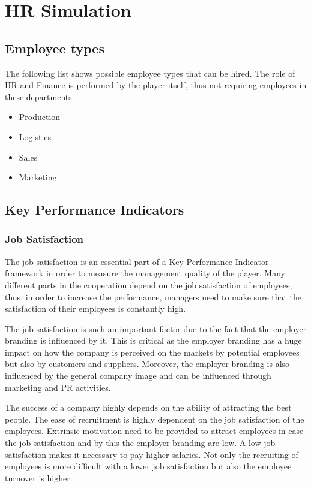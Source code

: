 \section{HR Simulation}

\subsection{Employee types}
The following list shows possible employee types that can be hired. The role of HR and Finance is performed by the player itself, thus not requiring employees in these departments.
\begin{itemize}
    \item Production
    \item Logistics
    \item Sales
    \item Marketing
\end{itemize}



\subsection{Key Performance Indicators}
\subsubsection{Job Satisfaction}
The job satisfaction is an essential part of a Key Performance Indicator framework in order to measure the management quality of the player. Many different parts in the cooperation depend on the job satisfaction of employees, thus, in order to increase the performance, managers need to make sure that the satisfaction of their employees is constantly high.\cite{KOYS}

The job satisfaction is such an important factor due to the fact that the employer branding is influenced by it. This is critical as the employer branding has a huge impact on how the company is perceived on the markets by potential employees but also by customers and suppliers. Moreover, the employer branding is also influenced by the general company image and can be influenced through marketing and PR activities. 

The success of a company highly depends on the ability of attracting the best people. The ease of recruitment is highly dependent on the job satisfaction of the employees. Extrinsic motivation need to be provided to attract employees in case the job satisfaction and by this the employer branding are low. A low job satisfaction makes it necessary to pay higher salaries. Not only the recruiting of employees is more difficult with a lower job satisfaction but also the employee turnover is higher. \cite{frederiksen2016}

